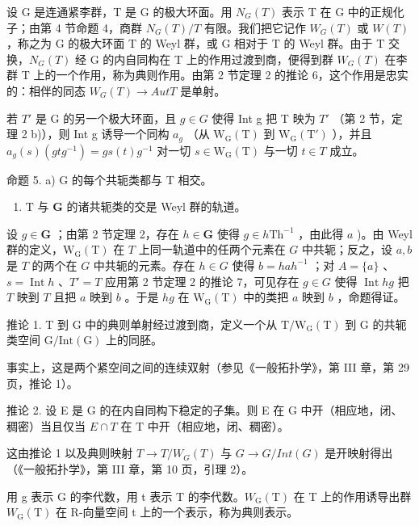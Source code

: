 设 G 是连通紧李群，T 是 G 的极大环面。用 \(N_{G}(T)\) 表示 T 在 G 中的正规化子；由第 4 节命题 4，商群 \(N_{G}(T)/T\) 有限。我们把它记作 \(W_{G}(T)\) 或 \(W(T)\) ，称之为 G 的极大环面 T 的 Weyl 群，或 G 相对于 T 的 Weyl 群。由于 T 交换，\(N_{G}(T)\) 经 G 的内自同构在 T 上的作用过渡到商，便得到群 \(W_{G}(T)\) 在李群 T 上的一个作用，称为典则作用。由第 2 节定理 2 的推论 6，这个作用是忠实的：相伴的同态 \(W_{G}(T) \rightarrow Aut T\) 是单射。

若 \(T'\) 是 G 的另一个极大环面，且 \(g \in G\) 使得 Int g 把 T 映为 \(T'\) （第 2 节，定理 2 b)），则 Int g 诱导一个同构 \(a_g\) （从 \(\mathrm{W}_{\mathrm{G}}(\mathrm{T})\) 到 \(\mathrm{W}_{\mathrm{G}}(\mathrm{T}')\) ），并且 \(a_g(s)(gtg^{-1}) = gs(t)g^{-1}\) 对一切 \(s \in \mathrm{W}_{\mathrm{G}}(\mathrm{T})\) 与一切 \(t \in T\) 成立。

命题 5. a) G 的每个共轭类都与 T 相交。

\begin{enumerate}
\def\labelenumi{\alph{enumi})}
\setcounter{enumi}{1}
\tightlist
\item
  \(\mathrm{T}\) 与 \(\mathbf{G}\) 的诸共轭类的交是 Weyl 群的轨道。
\end{enumerate}

设 \(g \in \mathbf{G}\) ；由第 2 节定理 2，存在 \(h \in \mathbf{G}\) 使得 \(g \in h\mathrm{Th}^{-1}\) ，由此得 \(a\) )。由 Weyl 群的定义，\(\mathrm{W_G(T)}\) 在 \(T\) 上同一轨道中的任两个元素在 \(G\) 中共轭；反之，设 \(a, b\) 是 \(T\) 的两个在 \(G\) 中共轭的元素。存在 \(h \in G\) 使得 \(b = hah^{-1}\) ；对 \(A = \{a\}\) 、\(s = \operatorname{Int} h\) 、\(T' = T\) 应用第 2 节定理 2 的推论 7，可见存在 \(g \in G\) 使得 \(\operatorname{Int} hg\) 把 \(T\) 映到 \(T\) 且把 \(a\) 映到 \(b\) 。于是 \(hg\) 在 \(\mathrm{W_G(T)}\) 中的类把 \(a\) 映到 \(b\) ，命题得证。

推论 1. T 到 G 中的典则单射经过渡到商，定义一个从 \(\mathrm{T}/\mathrm{W}_{\mathrm{G}}(\mathrm{T})\) 到 G 的共轭类空间 \(\mathrm{G}/\mathrm{Int}(\mathrm{G})\) 上的同胚。

事实上，这是两个紧空间之间的连续双射（参见《一般拓扑学》，第 III 章，第 29 页，推论 1）。

推论 2. 设 E 是 G 的在内自同构下稳定的子集。则 E 在 G 中开（相应地，闭、稠密）当且仅当 \(E \cap T\) 在 T 中开（相应地，闭、稠密）。

这由推论 1 以及典则映射 \(T \rightarrow T/W_{G}(T)\) 与 \(G \rightarrow G/Int(G)\) 是开映射得出（《一般拓扑学》，第 III 章，第 10 页，引理 2）。

用 g 表示 G 的李代数，用 t 表示 T 的李代数。\(W_{\mathrm{G}}(\mathrm{T})\) 在 T 上的作用诱导出群 \(W_{\mathrm{G}}(\mathrm{T})\) 在 R-向量空间 t 上的一个表示，称为典则表示。


